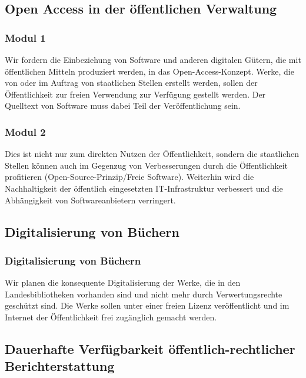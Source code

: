 \newpage
\subsection*{Open Access in der öffentlichen Verwaltung}

\subsubsection{Modul 1}
\abstimmung
Wir fordern die Einbeziehung von Software und anderen digitalen Gütern, die mit öffentlichen Mitteln produziert werden, in das Open-Access-Konzept. Werke, die von oder im Auftrag von staatlichen Stellen erstellt werden, sollen der Öffentlichkeit zur freien Verwendung zur Verfügung gestellt werden. Der Quelltext von Software muss dabei Teil der Veröffentlichung sein.

\subsubsection{Modul 2}
\abstimmung
Dies ist nicht nur zum direkten Nutzen der Öffentlichkeit, sondern die staatlichen Stellen können auch im Gegenzug von Verbesserungen durch die Öffentlichkeit profitieren (Open-Source-Prinzip/Freie Software). Weiterhin wird die Nachhaltigkeit der öffentlich eingesetzten IT-Infrastruktur verbessert und die Abhängigkeit von Softwareanbietern verringert.
 
\subsection*{Digitalisierung von Büchern}

\subsubsection{Digitalisierung von Büchern}
\abstimmung
Wir planen die konsequente Digitalisierung der Werke, die in den Landesbibliotheken vorhanden sind und nicht mehr durch Verwertungsrechte geschützt sind. Die Werke sollen unter einer freien Lizenz veröffentlicht und im Internet der Öffentlichkeit frei zugänglich gemacht werden.
 
\newpage
\subsection*{Dauerhafte Verfügbarkeit öffentlich-rechtlicher Berichterstattung}
\label{wp:oa:dauerhaft}

